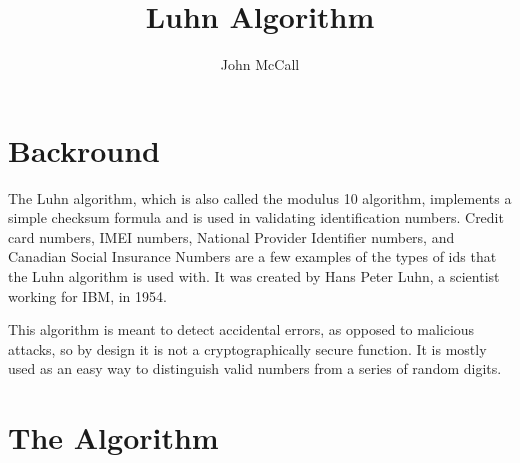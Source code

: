 \documentclass{article}
\title{Luhn Algorithm}
\author{John McCall}
\begin{document}
\maketitle

\section{Backround}
The Luhn algorithm, which is also called the modulus 10 algorithm, implements a simple
checksum formula and is used in validating identification numbers. Credit card numbers, IMEI
numbers, National Provider Identifier numbers, and Canadian Social Insurance Numbers are a
few examples of the types of ids that the Luhn algorithm is used with. It was created by
Hans Peter Luhn, a scientist working for IBM, in 1954.

This algorithm is meant to detect accidental errors, as opposed to malicious attacks, so by
design it is not a cryptographically secure function. It is mostly used as an easy way to
distinguish valid numbers from a series of random digits.

\section{The Algorithm}
\end{document}
